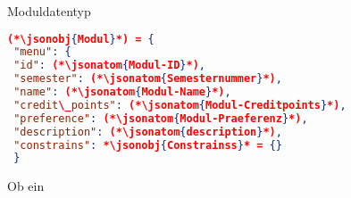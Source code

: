Moduldatentyp
 \begin{lstlisting}[language=json,firstnumber=-3]
 (*\jsonobj{Modul}*) = {
 "menu": {
 "id": (*\jsonatom{Modul-ID}*),
 "semester": (*\jsonatom{Semesternummer}*),
 "name": (*\jsonatom{Modul-Name}*),
 "credit\_points": (*\jsonatom{Modul-Creditpoints}*),
 "preference": (*\jsonatom{Modul-Praeferenz}*),
 "description": (*\jsonatom{description}*),
 "constrains": *\jsonobj{Constrainss}* = {}
 }
 \end{lstlisting}
 Ob ein